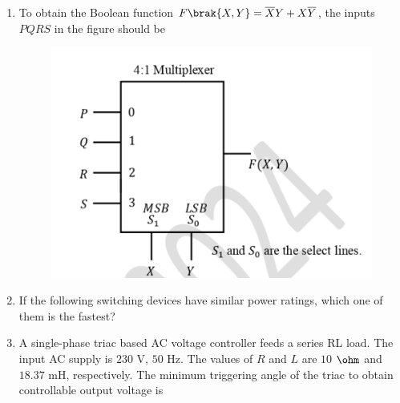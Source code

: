\documentclass[journal,12pt,onecolumn]{IEEEtran}
\theoremstyle{remark}
\begin{document}
\begin{enumerate}[start=1, label=Q.\arabic*]
    \item To obtain the Boolean function $F\brak{X,Y} = \overline{X}Y + X\overline{Y}$, the inputs $PQRS$ in the figure should be
    \begin{figure}[H]
        \centering
        \includegraphics[width=0.5\columnwidth]{Figures/q26.png}
        \caption{}
    \end{figure}
    \begin{enumerate}
    \end{enumerate}

    \hfill{}

    \item If the following switching devices have similar power ratings, which one of them is the fastest?
    \begin{enumerate}
    \end{enumerate}

    \hfill{}

    \item A single-phase triac based AC voltage controller feeds a series RL load. The input AC supply is $230$ V, $50$ Hz. The values of $R$ and $L$ are $10$ $\ohm$ and $18.37$ mH, respectively. The minimum triggering angle of the triac to obtain controllable output voltage is
    \begin{enumerate}
    \end{enumerate}


\end{enumerate}
\end{document}
